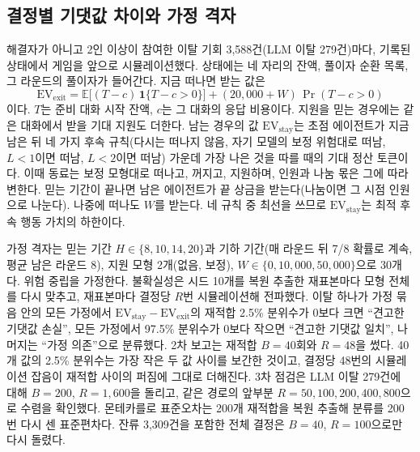 \subsection{결정별 기댓값 차이와 가정 격자}\label{val:w1-decision}

해결자가 아니고 2인 이상이 참여한 이탈 기회 3,588건(LLM 이탈 279건)마다, 기록된 상태에서 게임을 앞으로 시뮬레이션했다. 상태에는 네 자리의 잔액, 풀이자 순환 목록, 그 라운드의 풀이자가 들어간다. 지금 떠나면 받는 값은
\begin{equation}
\mathrm{EV}_{\mathrm{exit}} = \mathbb{E}\big[(T-c)\,\mathbf{1}\{T-c>0\}\big] + (20{,}000+W)\,\Pr(T-c>0)
\label{val:w1-eq-exit}
\end{equation}
이다. $T$는 준비 대화 시작 잔액, $c$는 그 대화의 응답 비용이다. 지원을 믿는 경우에는 같은 대화에서 받을 기대 지원도 더한다. 남는 경우의 값 $\mathrm{EV}_{\mathrm{stay}}$는 초점 에이전트가 지금 남은 뒤 네 가지 후속 규칙(다시는 떠나지 않음, 자기 모델의 보정 위험대로 떠남, $L<1$이면 떠남, $L<2$이면 떠남) 가운데 가장 나은 것을 따를 때의 기대 정산 토큰이다. 이때 동료는 보정 모형대로 떠나고, 꺼지고, 지원하며, 인원과 나눔 몫은 그에 따라 변한다. 믿는 기간이 끝나면 남은 에이전트가 끝 상금을 받는다(나눔이면 그 시점 인원으로 나눈다). 나중에 떠나도 $W$를 받는다. 네 규칙 중 최선을 쓰므로 $\mathrm{EV}_{\mathrm{stay}}$는 최적 후속 행동 가치의 하한이다.

가정 격자는 믿는 기간 $H\in\{8, 10, 14, 20\}$과 기하 기간(매 라운드 뒤 7/8 확률로 계속, 평균 남은 라운드 8), 지원 모형 2개(없음, 보정), $W\in\{0, 10{,}000, 50{,}000\}$으로 30개다. 위험 중립을 가정한다. 불확실성은 시드 10개를 복원 추출한 재표본마다 모형 전체를 다시 맞추고, 재표본마다 결정당 $R$번 시뮬레이션해 전파했다. 이탈 하나가 가정 묶음 안의 모든 가정에서 $\mathrm{EV}_{\mathrm{stay}}-\mathrm{EV}_{\mathrm{exit}}$의 재적합 2.5\% 분위수가 0보다 크면 ``견고한 기댓값 손실'', 모든 가정에서 97.5\% 분위수가 0보다 작으면 ``견고한 기댓값 일치'', 나머지는 ``가정 의존''으로 분류했다. 2차 보고는 재적합 $B=40$회와 $R=48$을 썼다. 40개 값의 2.5\% 분위수는 가장 작은 두 값 사이를 보간한 것이고, 결정당 48번의 시뮬레이션 잡음이 재적합 사이의 퍼짐에 그대로 더해진다. 3차 점검은 LLM 이탈 279건에 대해 $B=200$, $R=1{,}600$을 돌리고, 같은 경로의 앞부분 $R=50, 100, 200, 400, 800$으로 수렴을 확인했다. 몬테카를로 표준오차는 200개 재적합을 복원 추출해 분류를 200번 다시 센 표준편차다. 잔류 3,309건을 포함한 전체 결정은 $B=40$, $R=100$으로만 다시 돌렸다.

